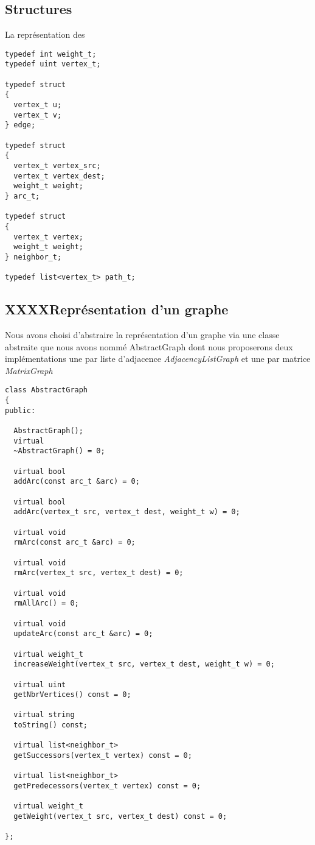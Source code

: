 \subsection{Structures}

La représentation des 

\begin{verbatim}
typedef int weight_t;
typedef uint vertex_t;

typedef struct
{
  vertex_t u;
  vertex_t v;
} edge;

typedef struct
{
  vertex_t vertex_src;
  vertex_t vertex_dest;
  weight_t weight;
} arc_t;

typedef struct
{
  vertex_t vertex;
  weight_t weight;
} neighbor_t;
  
typedef list<vertex_t> path_t;

\end{verbatim}

\subsection{XXXXReprésentation d'un graphe}

Nous avons choisi d'abstraire la représentation d'un graphe via une
classe abstraite que nous avons nommé AbstractGraph dont nous proposerons
deux implémentations une par liste d'adjacence \emph{AdjacencyListGraph} 
et une par matrice \emph{MatrixGraph}

\begin{verbatim}
class AbstractGraph
{
public:

  AbstractGraph();
  virtual
  ~AbstractGraph() = 0;

  virtual bool
  addArc(const arc_t &arc) = 0;

  virtual bool
  addArc(vertex_t src, vertex_t dest, weight_t w) = 0;

  virtual void
  rmArc(const arc_t &arc) = 0;

  virtual void
  rmArc(vertex_t src, vertex_t dest) = 0;

  virtual void
  rmAllArc() = 0;

  virtual void
  updateArc(const arc_t &arc) = 0;

  virtual weight_t
  increaseWeight(vertex_t src, vertex_t dest, weight_t w) = 0;

  virtual uint
  getNbrVertices() const = 0;

  virtual string
  toString() const;

  virtual list<neighbor_t>
  getSuccessors(vertex_t vertex) const = 0;

  virtual list<neighbor_t>
  getPredecessors(vertex_t vertex) const = 0;

  virtual weight_t
  getWeight(vertex_t src, vertex_t dest) const = 0;

};

\end{verbatim}

